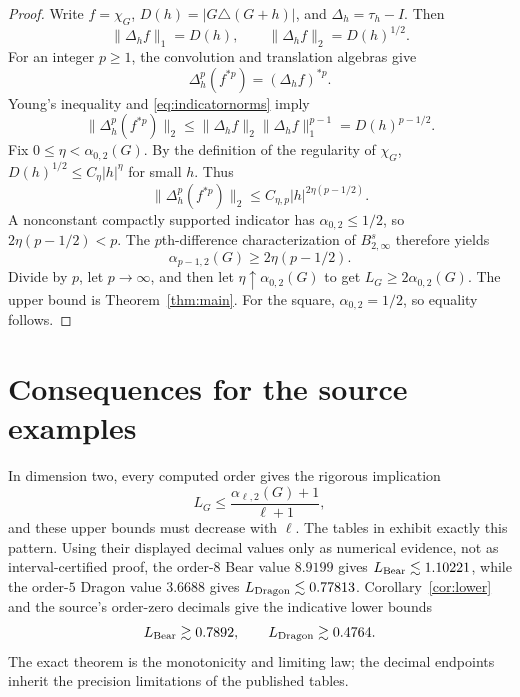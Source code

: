 \documentclass[11pt]{article}
\theoremstyle{remark}
\begin{document}
\begin{proof}
Write $f=\chi_G$, $D(h)=|G\triangle(G+h)|$, and
$\Delta_h=\tau_h-I$.  Then
\begin{equation}\label{eq:indicatornorms}
 \|\Delta_hf\|_1=D(h),\qquad
 \|\Delta_hf\|_2=D(h)^{1/2}.
\end{equation}
For an integer $p\ge1$, the convolution and translation algebras give
\begin{equation}\label{eq:diffidentity}
 \Delta_h^p(f^{*p})=(\Delta_hf)^{*p}.
\end{equation}
Young's inequality and \eqref{eq:indicatornorms} imply
\begin{equation}\label{eq:young}
 \|\Delta_h^p(f^{*p})\|_2
 \le \|\Delta_hf\|_2\|\Delta_hf\|_1^{p-1}
 =D(h)^{p-1/2}.
\end{equation}
Fix $0\le\eta<\alpha_{0,2}(G)$.  By the definition of the regularity of
$\chi_G$, $D(h)^{1/2}\le C_\eta|h|^\eta$ for small $h$.  Thus
\[
 \|\Delta_h^p(f^{*p})\|_2
 \le C_{\eta,p}|h|^{2\eta(p-1/2)}.
\]
A nonconstant compactly supported indicator has
$\alpha_{0,2}\le1/2$, so $2\eta(p-1/2)<p$.  The $p$th-difference
characterization of $B^s_{2,\infty}$ therefore yields
\[
 \alpha_{p-1,2}(G)\ge2\eta(p-1/2).
\]
Divide by $p$, let $p\to\infty$, and then let
$\eta\uparrow\alpha_{0,2}(G)$ to get $L_G\ge2\alpha_{0,2}(G)$.
The upper bound is Theorem~\ref{thm:main}.  For the square,
$\alpha_{0,2}=1/2$, so equality follows.
\end{proof}

\section{Consequences for the source examples}

In dimension two, every computed order gives the rigorous implication
\begin{equation}\label{eq:finitebound}
 L_G\le\frac{\alpha_{\ell,2}(G)+1}{\ell+1},
\end{equation}
and these upper bounds must decrease with $\ell$.  The tables in
\cite{ProtasovZaitseva2025} exhibit exactly this pattern.  Using their displayed
decimal values only as numerical evidence, not as interval-certified proof,
the order-$8$ Bear value $8.9199$ gives
$L_{\rm Bear}\lesssim1.10221$, while the order-$5$ Dragon value $3.6688$ gives
$L_{\rm Dragon}\lesssim0.77813$.  Corollary~\ref{cor:lower} and the source's
order-zero decimals give the indicative lower bounds
\[
 L_{\rm Bear}\gtrsim0.7892,
 \qquad L_{\rm Dragon}\gtrsim0.4764.
\]
The exact theorem is the monotonicity and limiting law; the decimal endpoints
inherit the precision limitations of the published tables.
\end{document}
